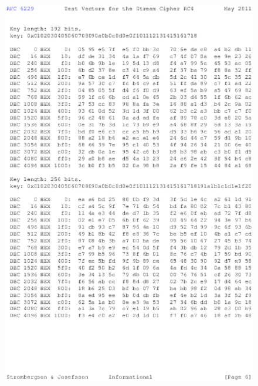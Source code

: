 \begin{anexosenv}
\begin{figure}
\centering
\includegraphics{figuras/file-5}
\end{figure}


\end{anexosenv}
